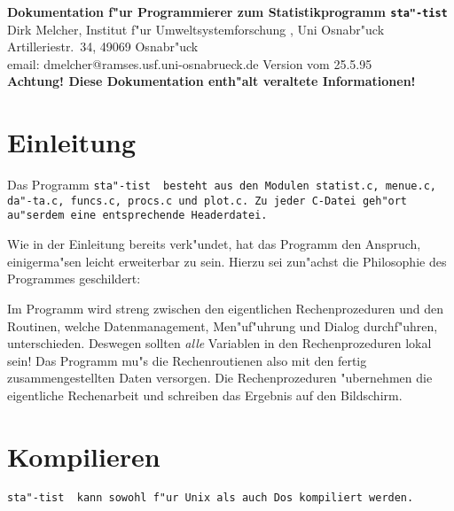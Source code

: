 
\voffset 1cm
\newcommand{\st}{\tt sta"-tist \rm}



\begin{center}
{\Large\bf Dokumentation f"ur Programmierer zum Statistikprogramm \st \\ }
\el
{\small Dirk Melcher, Institut f"ur Umweltsystemforschung , Uni
  Osnabr"uck\\ Artilleriestr.\ 34, 49069 Osnabr"uck\\
  email:  dmelcher@ramses.usf.uni-osnabrueck.de}
\el
\el
  Version vom 25.5.95\\
        {\bf Achtung! Diese Dokumentation enth"alt 
	veraltete Informationen!}
\end{center}

\section{Einleitung}

Das Programm \st\ besteht aus den Modulen {\tt statist.c, menue.c, da"-ta.c,
  funcs.c, procs.c} und {\tt plot.c}. Zu jeder C-Datei geh"ort
au"serdem eine entsprechende Headerdatei.

Wie in der Einleitung bereits verk"undet, hat das Programm den Anspruch,
einigerma"sen leicht erweiterbar zu sein. Hierzu sei zun"achst die
Philosophie des Programmes geschildert:

Im Programm wird streng zwischen den eigentlichen Rechenprozeduren und
den Routinen, welche Datenmanagement, Men"uf"uhrung und Dialog
durchf"uhren, unterschieden. Deswegen sollten {\em alle\/} Variablen
in den Rechenprozeduren lokal sein! Das Programm mu"s die
Rechenroutienen also mit den fertig zusammengestellten Daten
versorgen. Die Rechenprozeduren "ubernehmen die eigentliche
Rechenarbeit und schreiben das Ergebnis auf den Bildschirm.

\section{Kompilieren}
\st\ kann sowohl f"ur {\sc Unix} als auch {\sc Dos} kompiliert werden.



